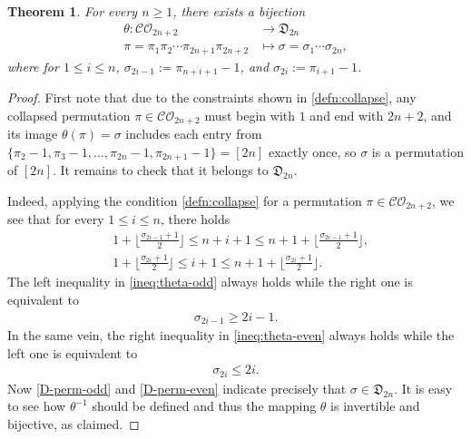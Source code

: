 \documentclass[11pt,reqno]{amsart}
\numberwithin{equation}{section}
\theoremstyle{plain}
\newtheorem{theorem}{Theorem}[section]
\theoremstyle{definition}
\newcommand{\fD}{\mathfrak{D}}
\def\CO{\mathcal{CO}}
\begin{document}
\begin{theorem}\label{bijection between D and Co}
For every $n\ge 1$, there exists a bijection
\begin{align*}
	\theta: \CO_{2n+2} &\rightarrow \fD_{2n}\\
	\pi=\pi_1\pi_2 \cdots \pi_{2n+1}\pi_{2n+2} &\mapsto \sigma=\sigma_1\cdots\sigma_{2n},
	  
\end{align*}
where for $1\le i\le n$, $\sigma_{2i-1}:=\pi_{n+i+1}-1$, and $\sigma_{2i}:=\pi_{i+1}-1$.
\end{theorem}
\begin{proof}
First note that due to the constraints shown in \eqref{defn:collapse}, any collapsed permutation $\pi\in\CO_{2n+2}$ must begin with $1$ and end with $2n+2$, and its image $\theta(\pi)=\sigma$ includes each entry from $\{\pi_2-1,\pi_3-1,\ldots,\pi_{2n}-1,\pi_{2n+1}-1\}=[2n]$ exactly once, so $\sigma$ is a permutation of $[2n]$. It remains to check that it belongs to $\fD_{2n}$.

Indeed, applying the condition \eqref{defn:collapse} for a permutation $\pi\in\CO_{2n+2}$, we see that for every $1\le i\le n$, there holds
\begin{align}
	& 1+\lfloor\frac{\sigma_{2i-1}+1}{2}\rfloor\le n+i+1\le n+1+\lfloor\frac{\sigma_{2i-1}+1}{2}\rfloor, \label{ineq:theta-odd}\\
	& 1+\lfloor\frac{\sigma_{2i}+1}{2}\rfloor\le i+1\le n+1+\lfloor\frac{\sigma_{2i}+1}{2}\rfloor.\label{ineq:theta-even}
\end{align}
The left inequality in \eqref{ineq:theta-odd} always holds while the right one is equivalent to
\begin{align}
	\sigma_{2i-1}\ge 2i-1.\label{D-perm-odd}
\end{align}
In the same vein, the right inequality in \eqref{ineq:theta-even} always holds while the left one is equivalent to
\begin{align}
	\sigma_{2i}\le 2i.\label{D-perm-even}
\end{align}
Now \eqref{D-perm-odd} and \eqref{D-perm-even} indicate precisely that $\sigma\in\fD_{2n}$. It is easy to see how $\theta^{-1}$ should be defined and thus the mapping $\theta$ is invertible and bijective, as claimed.

	
	
	
	
	
	
	
\end{proof}
\end{document}
